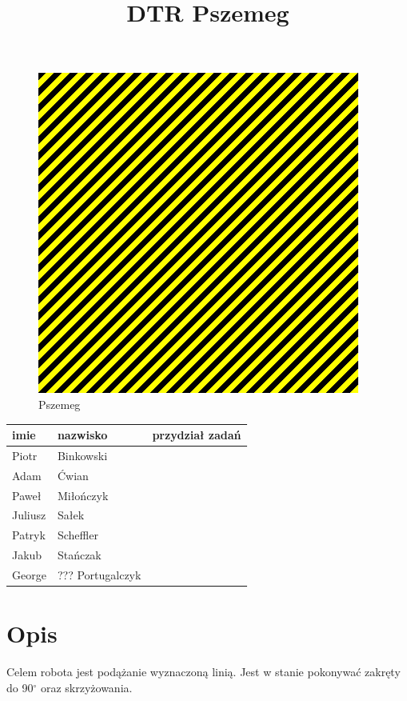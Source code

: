 \documentclass[a4paper,11pt]{article}
\def\SCALE{0.6}
\begin{document}
\title{DTR Pszemeg}

\maketitle

\begin{center}
\begin{figure}[H]
	\centering
	\includegraphics[width=\SCALE
	\paperwidth]{temp}
	\caption{Pszemeg}
\end{figure}

\begin{tabular}{|l|l|l|}
\hline
imie		& nazwisko		& przydział zadań \\ \hline
Piotr	& Binkowski		&			\\
Adam		& Ćwian			&			\\
Paweł	& Miłończyk		&			\\
Juliusz & Sałek			&			\\
Patryk	& Scheffler		&			\\
Jakub	& Stańczak		&			\\
George	& ??? Portugalczyk			&			\\ \hline
\end{tabular}
\end{center}

\tableofcontents

\listoffigures

\section{Opis}
Celem robota jest podążanie wyznaczoną linią. Jest w stanie pokonywać zakręty do 90$^\circ$ oraz skrzyżowania.
\end{document}
